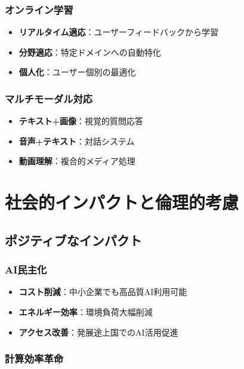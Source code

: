\documentclass[a4paper,12pt]{jsarticle}
\begin{document}
\subsubsection{オンライン学習}

\begin{itemize}
\item \textbf{リアルタイム適応}：ユーザーフィードバックから学習
\item \textbf{分野適応}：特定ドメインへの自動特化
\item \textbf{個人化}：ユーザー個別の最適化
\end{itemize}

\subsubsection{マルチモーダル対応}

\begin{itemize}
\item \textbf{テキスト+画像}：視覚的質問応答
\item \textbf{音声+テキスト}：対話システム
\item \textbf{動画理解}：複合的メディア処理
\end{itemize}

\section{社会的インパクトと倫理的考慮}

\subsection{ポジティブなインパクト}

\subsubsection{AI民主化}

\begin{itemize}
\item \textbf{コスト削減}：中小企業でも高品質AI利用可能
\item \textbf{エネルギー効率}：環境負荷大幅削減
\item \textbf{アクセス改善}：発展途上国でのAI活用促進
\end{itemize}

\subsubsection{計算効率革命}
\end{document}
